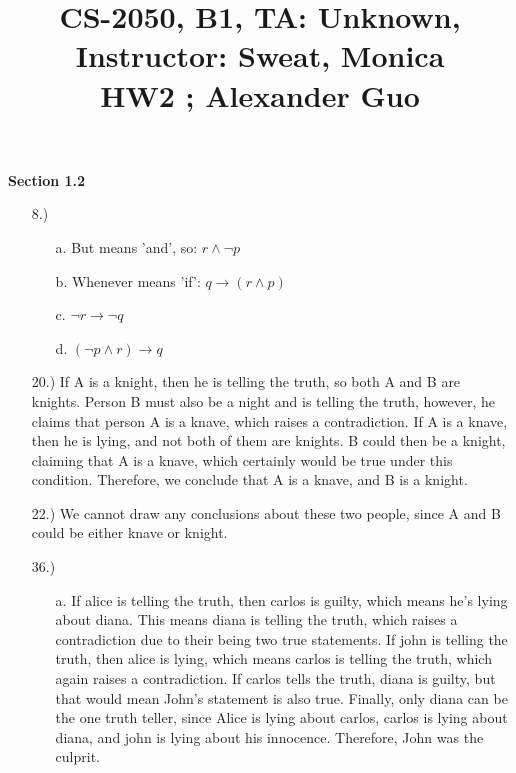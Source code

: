\documentclass{article}
\title{\large{\vspace{-1.0cm}CS-2050, B1, TA: Unknown, Instructor: Sweat, Monica \\ HW2 ; Alexander Guo}}
\date{}
\begin{document}
\maketitle

\vspace{-1.5cm}

\textbf{Section 1.2}

\begin{enumerate}

\item[8.)]

\begin{enumerate}

\item[a.] But means 'and', so: $r \wedge \neg p$

\item[b.] Whenever means 'if': $q \rightarrow (r \wedge p)$

\item[c.] $\neg r \rightarrow \neg q$

\item[d.] $(\neg p \wedge r) \rightarrow q$

\end{enumerate}

\item[20.)] If A is a knight, then he is telling the truth, so both A and B are knights. Person B must also be a night and is telling the truth, however, he claims that person A is a knave, which raises a contradiction. If A is a knave, then he is lying, and not both of them are knights. B could then be a knight, claiming that A is a knave, which certainly would be true under this condition. Therefore, we conclude that A is a knave, and B is a knight.

\item[22.)] We cannot draw any conclusions about these two people, since A and B could be either knave or knight.

\item[36.)]

\begin{enumerate}

\item[a.] If alice is telling the truth, then carlos is guilty, which means he's lying about diana. This means diana is telling the truth, which raises a contradiction due to their being two true statements. If john is telling the truth, then alice is lying, which means carlos is telling the truth, which again raises a contradiction. If carlos tells the truth, diana is guilty, but that would mean John's statement is also true. Finally, only diana can be the one truth teller, since Alice is lying about carlos, carlos is lying about diana, and john is lying about his innocence. Therefore, John was the culprit.


\end{enumerate}
\end{enumerate}
\end{document}
